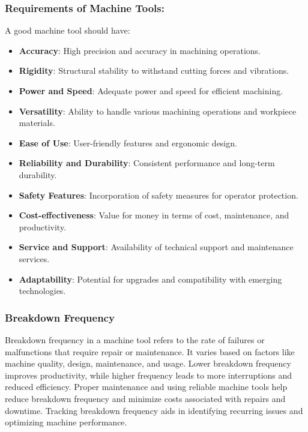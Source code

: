 \documentclass{article}
\begin{document}
\subsubsection*{Requirements of Machine Tools:}
A good machine tool should have:
\begin{itemize}
  \item \textbf{Accuracy}: High precision and accuracy in machining operations.
  \item \textbf{Rigidity}: Structural stability to withstand cutting forces and vibrations.
  \item \textbf{Power and Speed}: Adequate power and speed for efficient machining.
  \item \textbf{Versatility}: Ability to handle various machining operations and workpiece materials.
  \item \textbf{Ease of Use}: User-friendly features and ergonomic design.
  \item \textbf{Reliability and Durability}: Consistent performance and long-term durability.
  \item \textbf{Safety Features}: Incorporation of safety measures for operator protection.
  \item \textbf{Cost-effectiveness}: Value for money in terms of cost, maintenance, and productivity.
  \item \textbf{Service and Support}: Availability of technical support and maintenance services.
  \item \textbf{Adaptability}: Potential for upgrades and compatibility with emerging technologies.
\end{itemize}

\subsubsection*{Breakdown Frequency}
Breakdown frequency in a machine tool refers to the rate of failures or malfunctions that require repair or maintenance. It varies based on factors like machine quality, design, maintenance, and usage. Lower breakdown frequency improves productivity, while higher frequency leads to more interruptions and reduced efficiency. Proper maintenance and using reliable machine tools help reduce breakdown frequency and minimize costs associated with repairs and downtime. Tracking breakdown frequency aids in identifying recurring issues and optimizing machine performance.
\end{document}
